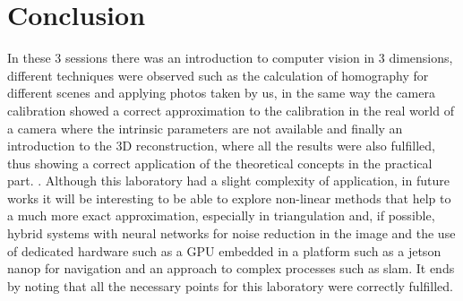 \documentclass[12pt, twoside]{report}
\begin{document}
\chapter{Conclusion}
In these 3 sessions there was an introduction to computer vision in 3 dimensions, different techniques were observed such as the calculation of homography for different scenes and applying photos taken by us, in the same way the camera calibration showed a correct approximation to the calibration in the real world of a camera where the intrinsic parameters are not available and finally an introduction to the 3D reconstruction, where all the results were also fulfilled, thus showing a correct application of the theoretical concepts in the practical part. . Although this laboratory had a slight complexity of application, in future works it will be interesting to be able to explore non-linear methods that help to a much more exact approximation, especially in triangulation and, if possible, hybrid systems with neural networks for noise reduction in the image and the use of dedicated hardware such as a GPU embedded in a platform such as a jetson nanop for navigation and an approach to complex processes such as slam. It ends by noting that all the necessary points for this laboratory were correctly fulfilled.

    

\end{document}
